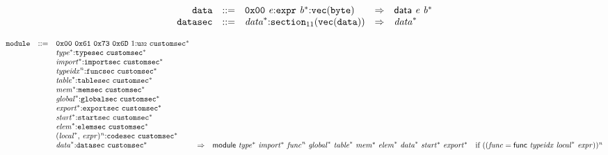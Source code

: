 \vspace{1ex}

$$
\begin{array}{@{}l@{}rrlll@{}l@{}}
& {\mathtt{data}} &::=& \mathtt{0x00}~{\mathit{e}}{:}{\mathtt{expr}}~{{\mathit{b}}^\ast}{:}{\mathtt{vec}}({\mathtt{byte}}) &\Rightarrow& \mathsf{data}~{\mathit{e}}~{{\mathit{b}}^\ast} \\
& {\mathtt{datasec}} &::=& {{\mathit{data}}^\ast}{:}{{\mathtt{section}}}_{11}({\mathtt{vec}}({\mathtt{data}})) &\Rightarrow& {{\mathit{data}}^\ast} \\
\end{array}
$$

\vspace{1ex}

$$
\begin{array}{@{}l@{}rrlll@{}l@{}}
& {\mathtt{module}} &::=& \mathtt{0x00}~\mathtt{0x61}~\mathtt{0x73}~\mathtt{0x6D}~1{:}{\mathtt{u{\scriptstyle32}}}~{{\mathtt{customsec}}^\ast} \\ &&&{{\mathit{type}}^\ast}{:}{\mathtt{typesec}}~{{\mathtt{customsec}}^\ast} \\ &&&{{\mathit{import}}^\ast}{:}{\mathtt{importsec}}~{{\mathtt{customsec}}^\ast} \\ &&&{{\mathit{typeidx}}^{{\mathit{n}}}}{:}{\mathtt{funcsec}}~{{\mathtt{customsec}}^\ast} \\ &&&{{\mathit{table}}^\ast}{:}{\mathtt{tablesec}}~{{\mathtt{customsec}}^\ast} \\ &&&{{\mathit{mem}}^\ast}{:}{\mathtt{memsec}}~{{\mathtt{customsec}}^\ast} \\ &&&{{\mathit{global}}^\ast}{:}{\mathtt{globalsec}}~{{\mathtt{customsec}}^\ast} \\ &&&{{\mathit{export}}^\ast}{:}{\mathtt{exportsec}}~{{\mathtt{customsec}}^\ast} \\ &&&{{\mathit{start}}^\ast}{:}{\mathtt{startsec}}~{{\mathtt{customsec}}^\ast} \\ &&&{{\mathit{elem}}^\ast}{:}{\mathtt{elemsec}}~{{\mathtt{customsec}}^\ast} \\ &&&{({{\mathit{local}}^\ast},\, {\mathit{expr}})^{{\mathit{n}}}}{:}{\mathtt{codesec}}~{{\mathtt{customsec}}^\ast} \\ &&&{{\mathit{data}}^\ast}{:}{\mathtt{datasec}}~{{\mathtt{customsec}}^\ast} &\Rightarrow& \mathsf{module}~{{\mathit{type}}^\ast}~{{\mathit{import}}^\ast}~{{\mathit{func}}^{{\mathit{n}}}}~{{\mathit{global}}^\ast}~{{\mathit{table}}^\ast}~{{\mathit{mem}}^\ast}~{{\mathit{elem}}^\ast}~{{\mathit{data}}^\ast}~{{\mathit{start}}^\ast}~{{\mathit{export}}^\ast} &\quad
  \mbox{if}~(({\mathit{func}} = \mathsf{func}~{\mathit{typeidx}}~{{\mathit{local}}^\ast}~{\mathit{expr}}))^{{\mathit{n}}} \\
\end{array}
$$

